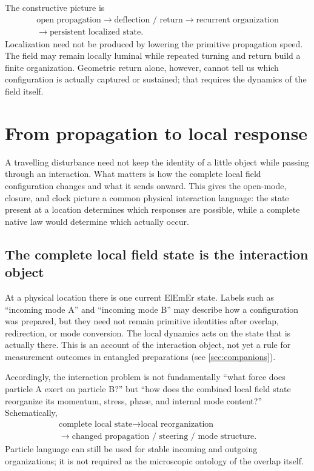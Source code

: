 \documentclass[11pt]{article}
\theoremstyle{definition}
\newcommand{\ElEmEr}{\mbox{ElEmEr}}
\begin{document}
The constructive picture is
\begin{equation}
\boxed{
\begin{gathered}
\text{open propagation}
\longrightarrow
\text{deflection / return}
\longrightarrow
\text{recurrent organization}\\
\longrightarrow
\text{persistent localized state}.
\end{gathered}}
\label{eq:closure_story}
\end{equation}
Localization need not be produced by lowering the primitive propagation speed.  The
field may remain locally luminal while repeated turning and return build a finite
organization.  Geometric return alone, however, cannot tell us which configuration is
actually captured or sustained; that requires the dynamics of the field itself.

\section{From propagation to local response}
\label{sec:structural}

A travelling disturbance need not keep the identity of a little object while
passing through an interaction.  What matters is how the complete local field
configuration changes and what it sends onward.  This gives the open-mode,
closure, and clock picture a common physical interaction language: the state
present at a location determines which responses are possible, while a complete
native law would determine which actually occur.

\subsection{The complete local field state is the interaction object}
\label{subsec:field_first}

At a physical location there is one current \ElEmEr{} state.  Labels such as ``incoming
mode A'' and ``incoming mode B'' may describe how a configuration was prepared, but they
need not remain primitive identities after overlap, redirection, or mode conversion.
The local dynamics acts on the state that is actually there.  This is an
account of the interaction object, not yet a rule for measurement outcomes
in entangled preparations (see \cref{sec:companions}).

Accordingly, the interaction problem is not fundamentally ``what force does particle A
exert on particle B?'' but ``how does the combined local field state reorganize its
momentum, stress, phase, and internal mode content?''  Schematically,
\begin{equation}
\boxed{
\begin{gathered}
\text{complete local state}
\longrightarrow
\text{local reorganization}\\
\longrightarrow
\text{changed propagation / steering / mode structure}.
\end{gathered}}
\label{eq:field_first_chain}
\end{equation}
Particle language can still be used for stable incoming and outgoing organizations; it
is not required as the microscopic ontology of the overlap itself.
\end{document}
